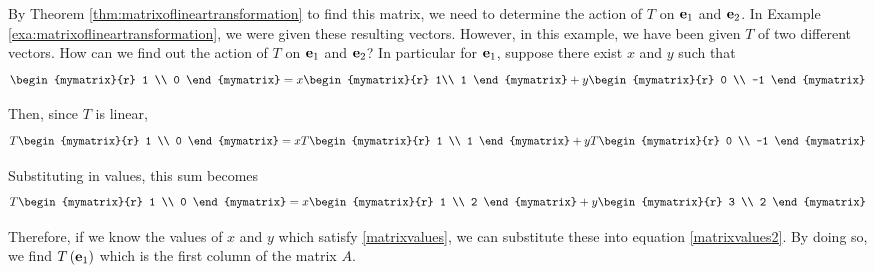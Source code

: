 \begin{solution} By Theorem \ref{thm:matrixoflineartransformation} to find this matrix, we need to determine the action of $T$ on
${\bf e}_{1}$ and ${\bf e}_{2}$. In Example \ref{exa:matrixoflineartransformation}, we were given these resulting vectors.
However, in this example, we have been given $T$ of two different vectors. How can we find out the action
of $T$ on ${\bf e}_{1}$ and ${\bf e}_{2}$? In particular for ${\bf e}_{1}$, suppose there exist $x$ and $y$ such that
\begin{equation}
\begin{mymatrix}{r}
1 \\
0
\end{mymatrix} = x\begin{mymatrix}{r}
1\\
1
\end{mymatrix} +y\begin{mymatrix}{r}
0 \\
-1 
\end{mymatrix} 
\label{matrixvalues}
\end{equation}

Then, since $T$ is linear,
\begin{equation*}
T\begin{mymatrix}{r}
1 \\
0 
\end{mymatrix}  = x T\begin{mymatrix}{r}
1 \\
1
\end{mymatrix} +y T\begin{mymatrix}{r}
0 \\
-1 
\end{mymatrix}
\end{equation*}

Substituting in values, this sum becomes
\begin{equation}
T\begin{mymatrix}{r}
1 \\
0 
\end{mymatrix} = 
 x\begin{mymatrix}{r}
1 \\
2
\end{mymatrix} +y\begin{mymatrix}{r}
3 \\
2
\end{mymatrix} 
\label{matrixvalues2}
\end{equation}

Therefore, if we know the values of $x$ and $y$ which satisfy \ref{matrixvalues}, we can substitute these into equation \ref{matrixvalues2}. By doing so,
we find $T\left({\bf e}_1\right)$ which is the first column of the matrix $A$. 


\end{solution}
